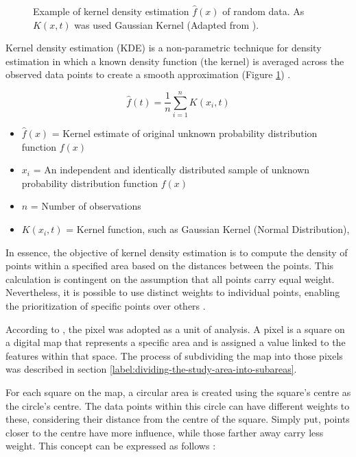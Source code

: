 \begin{figure}[ht]
	\centering
	
	\caption{Example of kernel density estimation $\hat{f}(x)$ of random data. As $K(x,t)$ was used Gaussian Kernel (Adapted from \cite{wkeglarczyk2018kernel}).}
	\label{fig:kernel-density}
\end{figure}

Kernel density estimation (KDE) is a non-parametric technique for density estimation in which a known density function (the kernel) is averaged across the observed data points to create a smooth approximation (Figure \ref{fig:kernel-density}) \cite{wkeglarczyk2018kernel}. 

\begin{equation}
    \hat{f}(t) = \frac{1}{n}\sum_{i=1}^{n} K(x_i,t)
    \label{eq:kernel-density}
\end{equation}

\begin{itemize}
    \item{$\hat{f}(x)$ = Kernel estimate of original unknown probability distribution function $f(x)$}
    \item{$x_i$ = An independent and identically distributed sample of unknown probability distribution function $f(x)$}
    \item{$n$ = Number of observations}
    \item{$K(x_i, t)$ = Kernel function, such as Gaussian Kernel (Normal Distribution), }
\end{itemize}

In essence, the objective of kernel density estimation is to compute the density of points within a specified area based on the distances between the points. This calculation is contingent on the assumption that all points carry equal weight. Nevertheless, it is possible to use distinct weights to individual points, enabling the prioritization of specific points over others \cite{roig2013retail}.

According to \cite{roig2013retail}, the pixel was adopted as a unit of analysis. A pixel is a square on a digital map that represents a specific area and is assigned a value linked to the features within that space. The process of subdividing the map into those pixels was described in section \ref{label:dividing-the-study-area-into-subareas}.

For each square on the map, a circular area is created using the square's centre as the circle's centre. The data points within this circle can have different weights to these, considering their distance from the centre of the square. Simply put, points closer to the centre have more influence, while those farther away carry less weight. This concept can be expressed as follows \cite{roig2013retail}:

